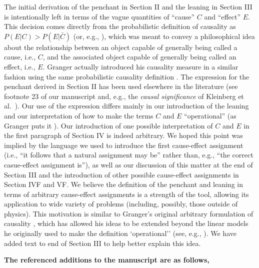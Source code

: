 \documentclass[a4paper,11pt]{article}
\begin{document}
The initial derivation of the penchant in Section II and the leaning in Section III is intentionally left in terms of the vague quantities of ``cause'' $C$ and ``effect'' $E$.  This decision comes directly from the probabilistic definition of causality as $P(E|C)>P(E|\bar{C})$ \cite{Suppes1970} (or, e.g., \cite{Illari2014}), which was meant to convey a philosophical idea about the relationship between an object capable of generally being called a cause, i.e., $C$, and the associated object capable of generally being called an effect, i.e., $E$.   Granger actually introduced his causality measure in a similar fashion using the same probabilistic causality definition \cite{Granger1980}.  The expression for the penchant derived in Section II has been used elsewhere in the literature (see footnote 23 of our manuscript and, e.g., the {\em causal significance} of Kleinberg et al.\ \cite{Kleinberg2012}).  Our use of the expression differs mainly in our introduction of the leaning and our interpretation of how to make the terms $C$ and $E$ ``operational'' (as Granger puts it \cite{Granger1980}).  Our introduction of one possible interpretation of $C$ and $E$ in the first paragraph of Section IV is indeed arbitrary.  We hoped this point was implied by the language we used to introduce the first cause-effect assignment (i.e., ``it follows that a natural assignment may be'' rather than, e.g., ``the correct casue-effect assignment is''), as well as our discussion of this matter at the end of Section III and the introduction of other possible cause-effect assignments in Section IVF and VF.  We believe the definition of the penchant and leaning in terms of arbitrary cause-effect assignments is a strength of the tool, allowing its application to wide variety of problems (including, possibly, those outside of physics).  This motivation is similar to Granger's original arbitrary formulation of causality \cite{Granger1980}, which has allowed his ideas to be extended beyond the linear models he originally used to make the definition `operational'' (see, e.g., \cite{Ancona2004}).  We have added text to end of Section III to help better explain this idea. 

{\bf The referenced additions to the manuscript are as follows,}
\end{document}
